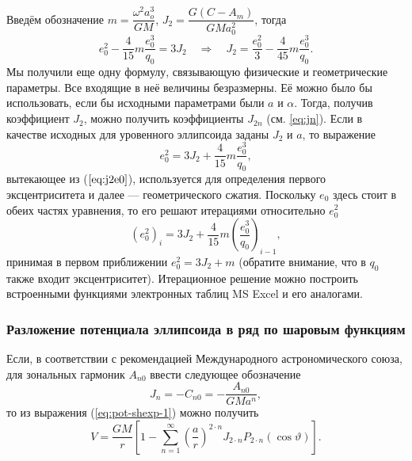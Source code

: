 \documentclass[11pt, a4paper,addpoints]{exam}
\theoremstyle{remark}
\renewcommand{\theta}{\vartheta}
\begin{document}
Введём обозначение $m = \dfrac{\omega^2 a_o^3}{GM}$, $J_2 = \dfrac{G\left( C - A_m
\right)}{GM a_0^2}$, тогда
\begin{equation}
    e_0^2 - \dfrac{4}{15}m\dfrac{e_0^3}{q_0} = 3J_2\quad\Longrightarrow\quad
    J_2 = \dfrac{e_0^2}{3} - \dfrac{4}{45}m\dfrac{e_0^3}{q_0}.
    \label{eq:j2e0}
\end{equation}
Мы получили еще одну формулу, связывающую физические и геометрические параметры. Все входящие
в неё величины безразмерны. Её можно было бы использовать, если бы исходными параметрами были
$a$ и $\alpha$. Тогда, получив коэффициент $J_2$, можно получить коэффициенты $J_{2n}$
(см. \ref{eq:jn}).
Если в качестве исходных для уровенного эллипсоида заданы $J_2$ и $a$, то выражение
\begin{equation}
    e_0^2 = 3J_2  + \dfrac{4}{15}m\dfrac{e_0^3}{q_0},
    \label{eq:j2e0-2}
\end{equation}
вытекающее из ($\ref{eq:j2e0}$), используется для определения первого эксцентриситета и далее ---
геометрического сжатия. Поскольку $e_0$ здесь стоит в обеих частях уравнения, то его решают
итерациями относительно $e_0^2$
\begin{equation}
    \left( e_0^2 \right)_{i} = 3J_2  + \dfrac{4}{15}m\left( \dfrac{e_0^3}{q_0} \right)_{i-1},
    \label{eq:j2e0-3}
\end{equation}
принимая в первом приближении $e_0^2 = 3J_2 + m$ (обратите внимание, что в $q_0$ также
входит эксцентриситет). Итерационное решение можно построить встроенными 
функциями электронных таблиц MS Excel и его аналогами.

\subsubsection*{Разложение потенциала эллипсоида в ряд по шаровым функциям}
Если, в соответствии с рекомендацией Международного астрономического союза, для зональных гармоник
$A_{n0}$ ввести следующее обозначение 
\begin{equation*}
    J_n = -C_{n0} = -\dfrac{A_{n0}}{GMa^n},
\end{equation*}
то из выражения (\ref{eq:pot-shexp-1}) можно получить
\begin{equation}
    V  = \dfrac{GM}{r}   
        \left[ 1 - \sum\limits_{n=1}^{\infty} \left( \dfrac{a}{r} \right)^{2\cdot n}
        J_{2\cdot n} P_{2\cdot n} \left( \cos\theta \right) \right].
        \label{eq:pot-shexp-2c}
\end{equation}
\end{document}
